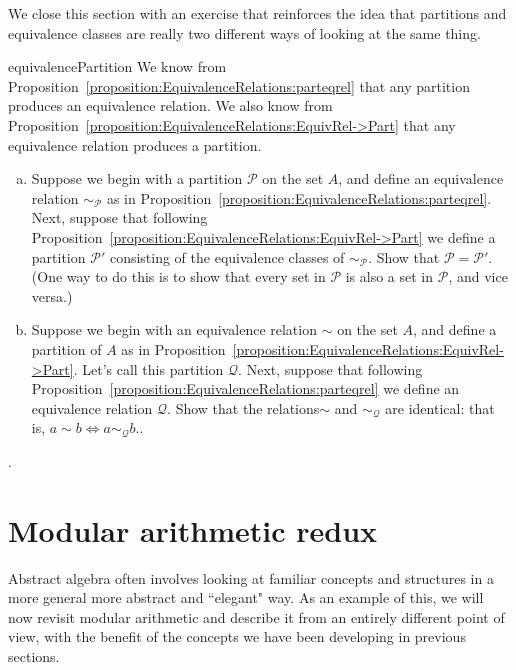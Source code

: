 We close this section with  an exercise that reinforces the idea that partitions and equivalence classes are really two different ways of looking at the same thing.

\begin{exercise}{equivalencePartition}
We know from Proposition~\ref{proposition:EquivalenceRelations:parteqrel} that any partition  produces an equivalence relation.  
We also know from Proposition~\ref{proposition:EquivalenceRelations:EquivRel->Part} that any equivalence relation produces a partition.
\begin{enumerate}[(a)]
\item
Suppose we begin with a partition $\mathcal{P}$ on the set $A$, and define an equivalence relation $\sim_{\mathcal{P}}$ as in Proposition~\ref{proposition:EquivalenceRelations:parteqrel}. Next, suppose that following Proposition~\ref{proposition:EquivalenceRelations:EquivRel->Part} we define a partition   $\mathcal{P}'$  consisting of the equivalence classes of $\sim_{\mathcal{P}}$. Show that $\mathcal{P}=\mathcal{P}'$. (One way to do this is to show that every set in $\mathcal{P}$ is also a set in $\mathcal{P}$, and vice versa.)
\item
Suppose we begin with an equivalence relation $\sim$ on the set $A$, and define a partition of $A$ as in Proposition~\ref{proposition:EquivalenceRelations:EquivRel->Part}. Let's call this partition $\mathcal{Q}$.  Next, suppose that following Proposition~\ref{proposition:EquivalenceRelations:parteqrel} we define an equivalence relation  $\mathcal{Q}$. Show that the relations$\sim$ and $\sim_{\mathcal{Q}}$ are identical:  that is, $a \sim b \iff a \sim_{\mathcal{Q}} b$..
\end{enumerate}
\end{exercise}. 


\section{Modular arithmetic redux\quad
{}} \label{sec:EquivalenceRelations:ModularArithmetic}

Abstract algebra often involves looking at familiar concepts and structures in a more general more abstract and ``elegant" way. As an example of this, we will now revisit modular arithmetic and describe it from an entirely different point of view, with the benefit of the concepts we have been developing in previous sections.


